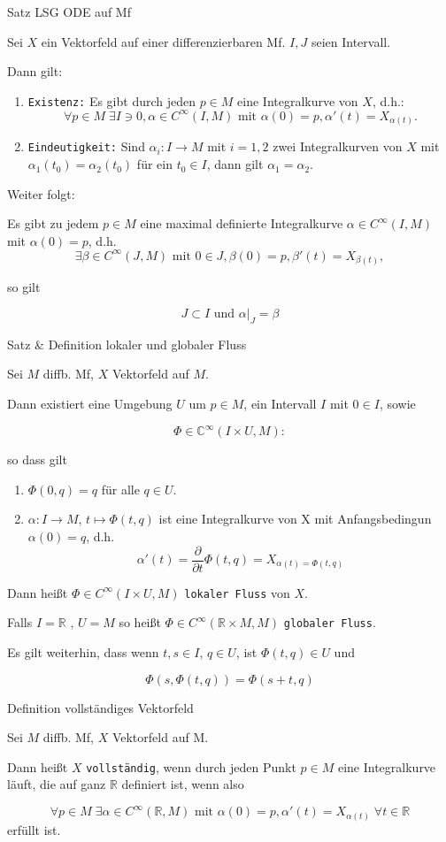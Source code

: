 \documentclass[a6paper,11pt,grid=front]{kartei}
\newcommand{\fl}[1]{\begin{flushleft}
 #1 \end{flushleft}}
\newcommand{\R}{\mathbb{R}}
\newcommand{\C}{\mathbb{C}}
\newcounter{def}
\begin{document}
\nonameyet
{Satz} {LSG ODE auf Mf}
{
\small
Sei $X$ ein Vektorfeld auf einer differenzierbaren Mf. $I,J$ seien Intervall.
\fl{Dann gilt:}
\begin{enumerate}[1.]
\item \texttt{Existenz:} Es gibt durch jeden $p\in M$ eine Integralkurve von $X$, d.h.: 
\[
\forall p\in M \; \exists I \ni 0, \alpha \in C^\infty(I,M) \text{ mit }
\alpha(0) = p, \alpha'(t) = X_{\alpha(t)}.
\]
%
\item \texttt{Eindeutigkeit:} Sind $\alpha_i : I \to M$ mit $i = 1,2$ 
zwei Integralkurven von $X$ mit $\alpha_1(t_0) = \alpha_2(t_0)$ für 
ein $t_0 \in I$, dann gilt $\alpha_1 = \alpha_2$.
\end{enumerate}
\fl{Weiter folgt:}
\vspace{-1em}
Es gibt zu jedem $p\in M$ eine maximal definierte Integralkurve 
$\alpha \in C^\infty(I,M)$ mit $\alpha(0) = p$, d.h.
\[
\exists \beta \in C^\infty(J, M) \text{ mit } 
0\in J, \beta(0) = p, \beta'(t) = X_{\beta(t)},
\]
\fl{so gilt}
\[
J \subset I \text{ und } \alpha|_J = \beta
\]
}
{}

\nonameyet
{\scriptsize Satz \& Definition } {\scriptsize lokaler und globaler Fluss}
{
\footnotesize
Sei $M$ diffb. Mf, $X$ Vektorfeld auf $M$. 
\fl{Dann existiert eine Umgebung $U$ um $p \in M$, ein Intervall $I$ 
mit $0\in I$, sowie}
\[
\Phi\in \C^\infty(I\times U, M): 
\]
\fl{so dass gilt}
\begin{enumerate}[1.]
\item $\Phi(0,q) = q$ für alle $q\in U$.
\item $\alpha : I \to M$, $t \mapsto \Phi(t,q)$ ist eine Integralkurve von X
mit Anfangsbedingun $\alpha(0) = q$,
d.h.
\[
\alpha'(t) = \frac{\partial}{\partial t} \Phi(t,q) = X_{\alpha(t) = \Phi(t,q)}
\]
\end{enumerate}
\fl{Dann heißt $\Phi\in C^\infty(I\times U, M)$ \texttt{lokaler Fluss}
von $X$.}
\fl{Falls $I = \R$ , $U = M$ so heißt $\Phi\in C^\infty(\R \times M, M)$
\texttt{globaler Fluss}.}
\fl{Es gilt weiterhin, dass wenn $t,s \in I$, $q\in U$, ist $\Phi(t,q) \in U$ und }
\[
\Phi(s, \Phi(t,q)) = \Phi(s + t, q)
\]
}
{}

\nonameyet
{Definition} {\small vollständiges Vektorfeld}
{
Sei $M$ diffb. Mf, $X$ Vektorfeld auf M.
\fl{Dann heißt $X$ \texttt{vollständig}, wenn durch jeden Punkt $p\in M$
eine Integralkurve läuft, die auf ganz $\R$ definiert ist, wenn also}
\[
\forall p\in M \; \exists \alpha \in C^\infty(\R,M) 
\text{ mit } \alpha(0) = p, \alpha'(t) = X_{\alpha(t)} \; \forall t\in\R
\]
erfüllt ist.
}
{}
\end{document}
